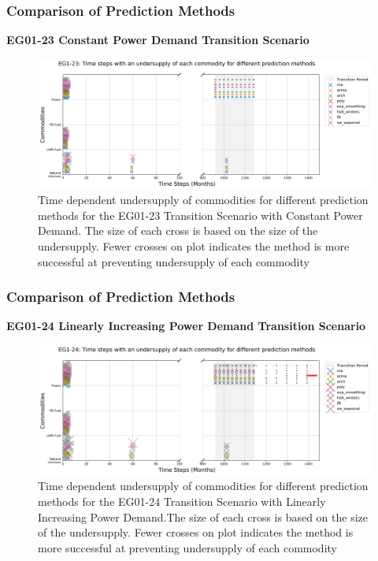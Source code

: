 \begin{frame}
    \frametitle{Comparison of Prediction Methods}
\textbf{EG01-23 Constant Power Demand Transition Scenario}

\begin{figure}[htbp!]
    \begin{center}
      \includegraphics[width=\textwidth]{../paper/figures/eg23-undersupply.png}
    \end{center}
          \caption{Time dependent undersupply of commodities for different
          prediction methods for the EG01-23 Transition Scenario with Constant Power Demand. The
          size of each cross is based on the size of the undersupply.
          Fewer crosses on plot indicates the method is more successful at preventing undersupply 
          of each commodity}
  \end{figure}
\end{frame}

\begin{frame}
    \frametitle{Comparison of Prediction Methods}
\textbf{EG01-24 Linearly Increasing Power Demand Transition Scenario}
\begin{figure}[htbp!]
    \begin{center}
      \includegraphics[width=\textwidth]{../paper/figures/eg24-undersupply.png}
    \end{center}
          \caption{Time dependent undersupply of commodities for different
          prediction methods for the EG01-24 Transition Scenario with Linearly Increasing Power Demand.The
          size of each cross is based on the size of the undersupply.
          Fewer crosses on plot indicates the method is more successful at preventing undersupply 
          of each commodity}
  \end{figure}
\end{frame}

